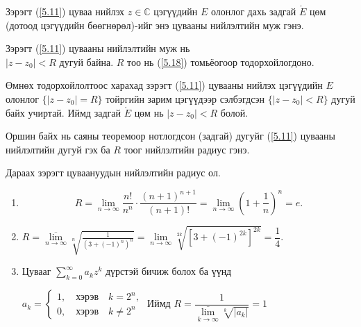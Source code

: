 \begin{dfn}
 Зэрэгт (\ref{5.11}) цуваа нийлэх $z\in \mathbb{C}$ цэгүүдийн $E$ олонлог дахь задгай $\mathring{E}$ цөм (дотоод цэгүүдийн бөөгнөрөл)-ийг энэ цувааны нийлэлтийн муж гэнэ.
\end{dfn}
\begin{thm}
Зэрэгт (\ref{5.11}) цувааны нийлэлтийн муж нь \\ $|z-z_0|<R$ дугуй байна. $R$ тоо нь (\ref{5.18}) томьёогоор тодорхойлогдоно.
\end{thm}
\begin{prf}
Өмнөх тодорхойлолтоос харахад зэрэгт (\ref{5.11}) цувааны нийлэх цэгүүдийн $E$ олонлог $\{|z-z_0|=R\}$ тойргийн зарим цэгүүдээр сэлбэгдсэн $\{|z-z_0|<R\}$ дугуй байх учиртай. Иймд задгай $\mathring{E}$ цөм нь $|z-z_0|<R$ болой. 
 \end{prf}
Оршин байх нь саяны теоремоор нотлогдсон (задгай) дугуйг (\ref{5.11}) цувааны нийлэлтийн дугуй гэх ба $R$ тоог нийлэлтийн радиус гэнэ.
\begin{exm}
Дараах зэрэгт цуваануудын нийлэлтийн радиус ол.
\end{exm}
\begin{sol}
\begin{enumerate}
    \item  [a)] $$R=\lim\limits_{n\rightarrow \infty} \frac{n!}{n^n}\cdot \frac{(n+1)^{n+1}}{(n+1)!}=\lim\limits_{n\rightarrow \infty} \left(1+\frac{1}{n}\right)^n =e.$$
    \item [б)] $R=\overline{\lim\limits_{n\rightarrow \infty}}\sqrt[n]{\frac{1}{(3+(-1)^n)^n}}=\lim\limits_{n\rightarrow \infty} \sqrt[2k]{[3+(-1)^{2k}]^{2k}}=\dfrac{1}{4}.$
    \item [в)] Цувааг $\sum\limits_{k=0}^\infty a_kz^k$ дүрстэй бичиж болох ба үүнд 
    
    $a_k= \begin{cases}
     1, \quad \text{хэрэв} \quad k=2^n, \\
      0, \quad \text{хэрэв} \quad k\neq 2^n
    \end{cases}$ Иймд $R=\dfrac{1}{\overline{\lim\limits_{k\rightarrow \infty}}\sqrt[k]{|a_k|}}=1$
\end{enumerate}
\end{sol}
